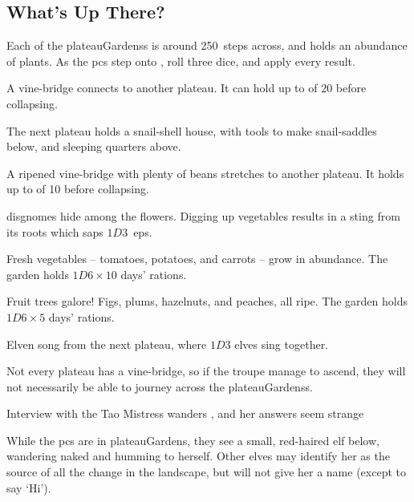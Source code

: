 \begin{multicols}{2}

\subsection{What's Up There?}

Each of the \glspl{plateauGardens} is around 250~\glspl{step} across, and holds an abundance of plants.
As the \glspl{pc} step onto , roll three dice, and apply every result.

\begin{dlist}
  \item
  A vine-bridge connects to another plateau.
  It can hold up to  of 20 before collapsing.
  
  The next plateau holds a snail-shell house, with tools to make snail-saddles below, and sleeping quarters above.
  \item
  A ripened vine-bridge with plenty of beans stretches to another plateau.
  It holds up to  of 10 before collapsing.
  \item
  \Glspl{disgnome} hide among the flowers.
  Digging up vegetables results in a sting from its roots which saps $1D3$~\glspl{ep}.
  \item
  Fresh vegetables -- tomatoes, potatoes, and carrots -- grow in abundance.
  The garden holds $1D6 \times 10$ days' \glspl{ration}.
  \item
  Fruit trees galore!
  Figs, plums, hazelnuts, and peaches, all ripe.
  The garden holds $1D6 \times 5$ days' \glspl{ration}.
  \item
  Elven song from the next plateau, where $1D3$ elves sing together.
\end{dlist}

Not every plateau has a vine-bridge, so if the troupe manage to ascend, they will not necessarily be able to journey across the \glspl{plateauGardens}.


{Interview with the Tao Mistress}%
{ wanders , and her answers seem strange}%

While the \glspl{pc} are in \gls{plateauGardens}, they see a small, red-haired elf below, wandering naked and humming to herself.
Other elves may identify her as the source of all the change in the landscape, but will not give her a name (except to say `Hi').


\end{multicols}
